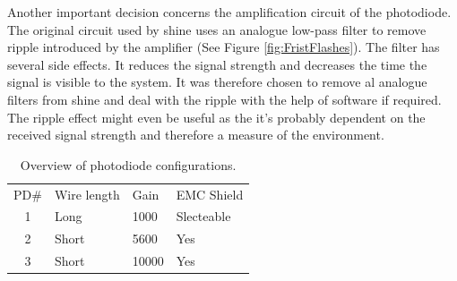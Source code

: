 Another important decision concerns the amplification circuit of the photodiode. The original circuit used by shine uses an analogue low-pass filter to remove ripple introduced by the amplifier (See Figure \ref{fig:FristFlashes}). The filter has several side effects. It reduces the signal strength and decreases the time the signal is visible to the system. It was therefore chosen to remove al analogue filters from shine and deal with the ripple with the help of software if required. The ripple effect might even be useful as the it's probably dependent on the received signal strength and therefore a measure of the environment.

\begin{table}[]
	\centering
	\begin{tabular}{clll}
		PD\#                   & Wire length & Gain  & EMC Shield \\ \cline{2-4} 
		\multicolumn{1}{c|}{1} & Long        & 1000  & Slecteable \\
		\multicolumn{1}{c|}{2} & Short       & 5600  & Yes        \\
		\multicolumn{1}{c|}{3} & Short       & 10000 & Yes       
	\end{tabular}
	\caption{Overview of photodiode configurations.\label{tbl:PDs}}
\end{table}

